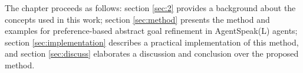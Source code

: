 The chapter proceeds as follows: section \ref{sec:2} provides a background about the concepts used in this work; section \ref{sec:method} presents the method and examples for preference-based abstract goal refinement in AgentSpeak(L) agents; section \ref{sec:implementation} describes a practical implementation of this method, and section \ref{sec:discuss} elaborates a discussion and conclusion over the proposed method. 




